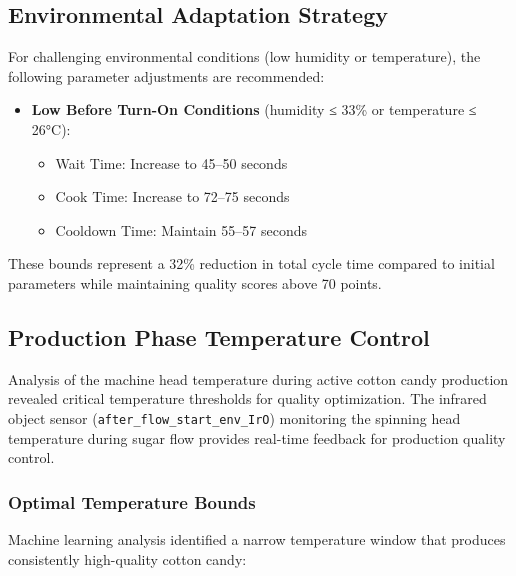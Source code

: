 \subsection{Environmental Adaptation Strategy}

For challenging environmental conditions (low humidity or temperature), the following parameter adjustments are recommended:

\begin{itemize}
    \item \textbf{Low Before Turn-On Conditions} (humidity ≤ 33\% or temperature ≤ 26°C):
    \begin{itemize}
        \item Wait Time: Increase to 45--50 seconds
        \item Cook Time: Increase to 72--75 seconds  
        \item Cooldown Time: Maintain 55--57 seconds
    \end{itemize}
\end{itemize}

These bounds represent a 32\% reduction in total cycle time compared to initial parameters while maintaining quality scores above 70 points.

\subsection{Production Phase Temperature Control}

Analysis of the machine head temperature during active cotton candy production revealed critical temperature thresholds for quality optimization. The infrared object sensor (\texttt{after\_flow\_start\_env\_IrO}) monitoring the spinning head temperature during sugar flow provides real-time feedback for production quality control.

\subsubsection{Optimal Temperature Bounds}

Machine learning analysis identified a narrow temperature window that produces consistently high-quality cotton candy:

